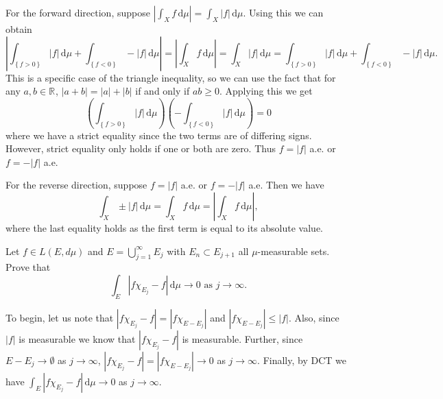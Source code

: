 \begin{solution}
  For the forward direction, suppose $\left| \int_{X} \! f \, \mathrm{d}\mu  \right| = \int_{X} \! \left| f \right| \, \mathrm{d}\mu $.
  Using this we can obtain
  \[
  \left| \int_{\left\{ f > 0 \right\}} \! \left| f \right| \, \mathrm{d} \mu + \int_{\left\{ f < 0 \right\}} \! - \left| f \right| \, \mathrm{d} \mu  \right| = \left| \int_{X} \! f \, \mathrm{d} \mu  \right| = \int_{X} \! \left| f \right| \, \mathrm{d} \mu =  \int_{\left\{ f > 0 \right\}} \! \left| f \right| \, \mathrm{d} \mu + \int_{\left\{ f < 0 \right\}} \! - \left| f \right| \, \mathrm{d} \mu
  .\] 
  This is a specific case of the triangle inequality, so we can use the fact that for any $a,b \in \mathbb{R}^{}$, $\left| a + b \right| = \left| a \right| + \left| b \right|$ if and only if $ab \geq 0$.
  Applying this we get
  \[
  \left( \int_{\left\{ f > 0 \right\}} \! \left| f \right| \, \mathrm{d} \mu  \right) \left( - \int_{\left\{ f < 0 \right\}} \! \left| f \right| \, \mathrm{d} \mu \right) = 0
  \] 
  where we have a strict equality since the two terms are of differing signs.
  However, strict equality only holds if one or both are zero.
  Thus $f = \left| f \right|$ a.e. or $f = - \left| f \right|$ a.e.

  For the reverse direction, suppose $f = \left| f \right|$ a.e. or $f = - \left| f \right|$ a.e.
  Then we have
  \[
  \int_{X} \! \pm \left| f \right| \, \mathrm{d} \mu = \int_{X} \! f \, \mathrm{d} \mu = \left| \int_{X} \! f \, \mathrm{d} \mu  \right|
  ,\]
  where the last equality holds as the first term is equal to its absolute value.
\end{solution}

\pagebreak

\begin{problem}{4}
  Let $f \in L\left( E, d \mu \right)$ and $E = \bigcup_{j=1}^{\infty} E_{j} $ with $E_{n} \subset E_{j+1}$ all $\mu$-measurable sets.
  Prove that
  \[
  \int_{E} \! \left| f \chi_{E_{j}} - f \right| \, \mathrm{d} \mu \to 0 \text{ as } j \to \infty
  .\] 
\end{problem}

\begin{solution}
  To begin, let us note that $\left| f \chi_{E_{j}} - f \right| = \left| f \chi_{E-E_{j}} \right|$ and $\left| f \chi_{E-E_{j}} \right| \leq \left| f \right|$.
  Also, since $\left| f \right|$ is measurable we know that $\left| f \chi_{E_{j}} - f \right|$ is measurable.
  Further, since $E-E_{j} \to \emptyset$ as $j \to \infty$, $\left| f \chi_{E_{j}} - f \right| = \left| f \chi_{E - E_{j}} \right| \to 0$ as $j \to \infty$.
  Finally, by DCT we have $\int_{E} \! \left| f \chi_{E_{j}} - f \right| \, \mathrm{d} \mu \to 0 $ as $ j \to \infty$.
\end{solution}

